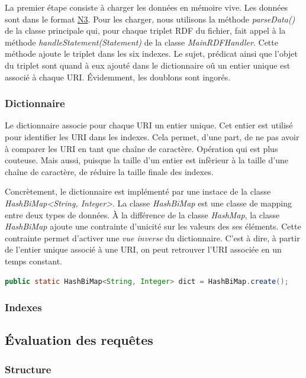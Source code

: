 \documentclass[12pt,titlepage]{article}
\begin{document}
La premier étape consiste à charger les données en mémoire vive. Les données sont dans le format \href{https://fr.wikipedia.org/wiki/Notation3}{N3}. Pour les charger, nous utilisons la méthode \textit{parseData()} de la classe principale qui, pour chaque triplet RDF du fichier, fait appel à la méthode \textit{handleStatement(Statement)} de la classe \textit{MainRDFHandler}. Cette méthode ajoute le triplet dans les six indexes. Le sujet, prédicat ainsi que l'objet du triplet sont quand à eux ajouté dans le dictionnaire oû un entier unique est associé à chaque URI. Évidemment, les doublons sont ingorés.

\subsubsection{Dictionnaire}

Le dictionnaire associe pour chaque URI un entier unique. Cet entier est utilisé pour identifier les URI dans les indexes. Cela permet, d'une part, de ne pas avoir à comparer les URI en tant que chaîne de caractère. Opération qui est plus couteuse. Mais aussi, puisque la taille d'un entier est infèrieur à la taille d'une chaîne de caractère, de réduire la taille finale des indexes.

Concrètement, le dictionnaire est implémenté par une instace de la classe \textit{HashBiMap<String, Integer>}. La classe \textit{HashBiMap} est une classe de mapping entre deux types de données. À la différence de la classe \textit{HashMap}, la classe \textit{HashBiMap} ajoute une contrainte d'unicité sur les valeurs des ses éléments. Cette contrainte permet d'activer une \textit{vue inverse} du dictionnaire. C'est à dire, à partir de l'entier unique associé à une URI, on peut retrouver l'URI associée en un temps constant.

\begin{lstlisting}[language=Java]
	public static HashBiMap<String, Integer> dict = HashBiMap.create();
\end{lstlisting}

\subsubsection{Indexes}

\subsection{Évaluation des requêtes}

\subsubsection{Structure}
\end{document}
